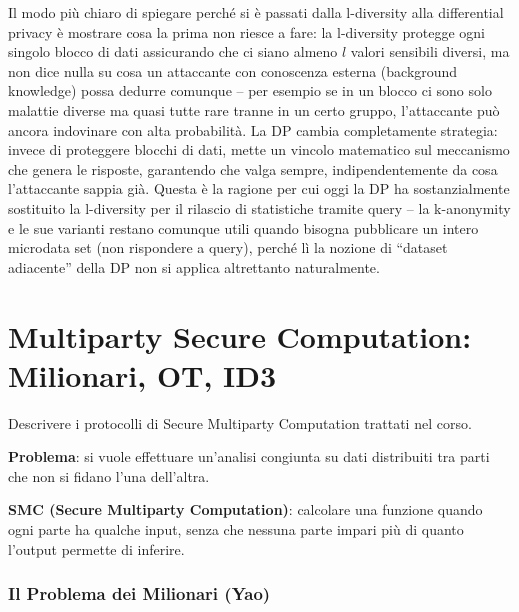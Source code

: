 \documentclass[a4paper,11pt]{article}
\begin{document}
\begin{nota}
Il modo pi\`{u} chiaro di spiegare perch\'{e} si \`{e} passati dalla l-diversity alla differential privacy \`{e} mostrare cosa la prima non riesce a fare: la l-diversity protegge ogni singolo blocco di dati assicurando che ci siano almeno $l$ valori sensibili diversi, ma non dice nulla su cosa un attaccante con conoscenza esterna (background knowledge) possa dedurre comunque -- per esempio se in un blocco ci sono solo malattie diverse ma quasi tutte rare tranne in un certo gruppo, l'attaccante pu\`{o} ancora indovinare con alta probabilit\`{a}. La DP cambia completamente strategia: invece di proteggere blocchi di dati, mette un vincolo matematico sul meccanismo che genera le risposte, garantendo che valga sempre, indipendentemente da cosa l'attaccante sappia gi\`{a}. Questa \`{e} la ragione per cui oggi la DP ha sostanzialmente sostituito la l-diversity per il rilascio di statistiche tramite query -- la k-anonymity e le sue varianti restano comunque utili quando bisogna pubblicare un intero microdata set (non rispondere a query), perch\'{e} l\`{i} la nozione di ``dataset adiacente'' della DP non si applica altrettanto naturalmente.
\end{nota}

\section{Multiparty Secure Computation: Milionari, OT, ID3}

\begin{domanda}
Descrivere i protocolli di Secure Multiparty Computation trattati nel corso.
\end{domanda}

\textbf{Problema}: si vuole effettuare un'analisi congiunta su dati distribuiti tra parti che non si fidano l'una dell'altra.

\textbf{SMC (Secure Multiparty Computation)}: calcolare una funzione quando ogni parte ha qualche input, senza che nessuna parte impari pi\`{u} di quanto l'output permette di inferire.

\subsubsection*{Il Problema dei Milionari (Yao)}
\end{document}
